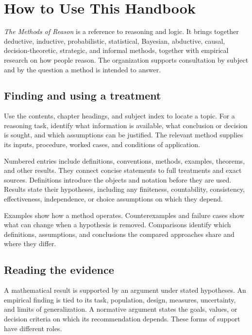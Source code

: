 \frontmatter
\tableofcontents
\mainmatter

\chapter*{How to Use This Handbook}

\emph{The Methods of Reason} is a reference to reasoning and logic.
It brings together deductive, inductive, probabilistic, statistical,
Bayesian, abductive, causal, decision-theoretic, strategic, and informal
methods, together with empirical research on how people reason.
The organization supports consultation by subject and by the question
a method is intended to answer.

\section*{Finding and using a treatment}

Use the contents, chapter headings, and subject index to locate a topic.
For a reasoning task, identify what information is available, what
conclusion or decision is sought, and which assumptions can be justified.
The relevant method supplies its inputs, procedure, worked cases, and
conditions of application.

Numbered entries include definitions, conventions, methods, examples,
theorems, and other results. They connect concise statements to full
treatments and exact sources. Definitions introduce the objects and
notation before they are used. Results state their hypotheses, including
any finiteness, countability, consistency, effectiveness, independence,
or choice assumptions on which they depend.

Examples show how a method operates. Counterexamples and failure cases
show what can change when a hypothesis is removed. Comparisons identify
which definitions, assumptions, and conclusions the compared approaches
share and where they differ.

\section*{Reading the evidence}

A mathematical result is supported by an argument under stated
hypotheses. An empirical finding is tied to its task, population, design,
measures, uncertainty, and limits of generalization. A normative argument
states the goals, values, or decision criteria on which its recommendation
depends. These forms of support have different roles.

